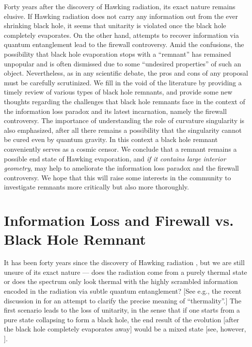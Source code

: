 \documentclass[12pt]{article}
\newcommand{\2}{$^2$}
\newcommand{\3}{$^3$}
\newcommand{\4}{$_4$}
\newcommand{\5}{$_5$}
\begin{document}
\medskip
Forty years after the discovery of Hawking radiation, its exact nature remains elusive. If Hawking radiation does not carry any information out from the ever shrinking black hole, it seems that unitarity is violated once the black hole completely evaporates. On the other hand, attempts to recover information via quantum entanglement lead to the firewall controversy. Amid the confusions, the possibility that black hole evaporation stops with a ``remnant'' has remained unpopular and is often dismissed due to some ``undesired properties'' of such an object. Nevertheless, as in any scientific debate, the pros and cons of any proposal must be carefully scrutinized. We fill in the void of the literature by providing a timely review of various types of black hole remnants, and provide some new thoughts regarding the challenges that black hole remnants face in the context of the information loss paradox and its latest incarnation, namely the firewall controversy. The importance of understanding the role of curvature singularity is also emphasized, after all there remains a possibility that the singularity cannot be cured even by quantum gravity. In this context a black hole remnant conveniently serves as a cosmic censor.  
We conclude that a remnant remains a possible end state of Hawking evaporation, and \emph{if it contains large interior geometry}, may help to ameliorate the information loss paradox and the firewall controversy.  
We hope that this will raise some interests in the community to investigate remnants more critically but also more thoroughly.


\newpage
\tableofcontents

\section{Information Loss and Firewall vs. Black Hole Remnant}


It has been forty years since the discovery of Hawking radiation \cite{Hawking1, Hawking2}, but we are still unsure of its exact nature --- does the radiation come from a purely thermal state or does the spectrum only look thermal with the highly scrambled information encoded in the radiation via subtle quantum entanglement? [See e.g., the recent discussion in \cite{visser01} for an attempt to clarify the precise meaning of ``thermality''.] The first scenario leads to the loss of unitarity, in the sense that if one starts from a pure state collapsing to form a black hole, the end result of the evolution [after the black hole completely evaporates away] would be a mixed state [see, however, \cite{myers01}].
\end{document}
